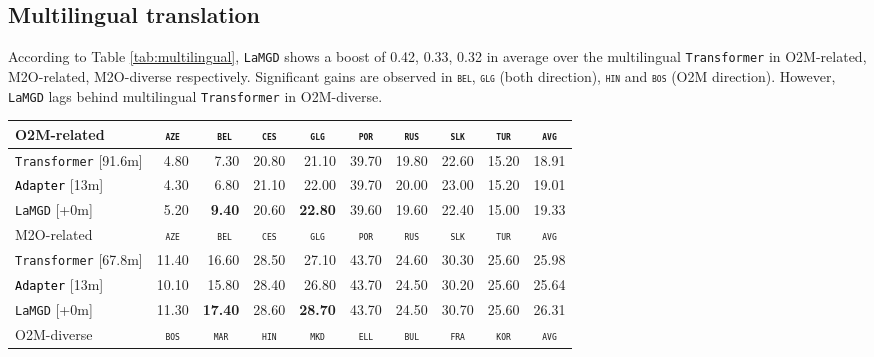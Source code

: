 \documentclass[11pt]{article}
\newcommand{\revision}[1]{\textcolor{black}{#1}}
\newcommand{\domain}[1]{\texttt{\textsc{#1}}}
\newcommand{\system}[1]{\texttt{{#1}}}
\newcommand{\SB}[1]{\textbf{#1}}
\begin{document}
\subsection{Multilingual translation}
According to Table \ref{tab:multilingual}, \system{LaMGD} shows a boost of 0.42, 0.33, 0.32 in average over the multilingual \system{Transformer} in O2M-related, M2O-related, M2O-diverse respectively. Significant gains are observed in \domain{bel}, \domain{glg} (both direction), \domain{hin} and \domain{bos} (O2M direction). However, \system{LaMGD} lags behind multilingual \system{Transformer} in O2M-diverse. 
\begin{table}[h!]
  \centering
  \begin{tabular}{|p{4cm}|*{9}{r|}} \hline
    O2M-related & \multicolumn{1}{c|}{\domain{aze}} & \multicolumn{1}{c|}{\domain{ bel}} & \multicolumn{1}{c|}{\domain{ces}} & \multicolumn{1}{c|}{\domain{glg}} & \multicolumn{1}{c|}{\domain{por}} & \multicolumn{1}{c|}{\domain{rus}} & \multicolumn{1}{c|}{\domain{slk}} & \multicolumn{1}{c|}{\domain{tur}} & \multicolumn{1}{c|}{\domain{avg}} \\ \hline 
    \system{Transformer}  \hfill{\footnotesize[91.6m]} & 4.80 &7.30&20.80&21.10&39.70&19.80&22.60&15.20&18.91 \\
    \revision{\system{Adapter}}   \hfill{\footnotesize[13m]} &4.30&6.80&21.10&22.00&39.70&20.00&23.00&15.20&19.01 \\ 
    \system{LaMGD}  \hfill{\footnotesize[+0m]}  & 5.20&\SB{9.40}&20.60&\SB{22.80}&39.60&19.60&22.40&15.00&19.33 \\ 
	\hline
    \hline
    M2O-related & \multicolumn{1}{c|}{\domain{aze}} & \multicolumn{1}{c|}{\domain{ bel}} & \multicolumn{1}{c|}{\domain{ces}} & \multicolumn{1}{c|}{\domain{glg}} & \multicolumn{1}{c|}{\domain{por}} & \multicolumn{1}{c|}{\domain{rus}} & \multicolumn{1}{c|}{\domain{slk}} & \multicolumn{1}{c|}{\domain{tur}} & \multicolumn{1}{c|}{\domain{avg}} \\ \hline 
    \system{Transformer}  \hfill{\footnotesize[67.8m]} &11.40&16.60&28.50&	27.10&43.70&24.60&30.30&25.60&25.98 \\
    \revision{\system{Adapter}}   \hfill{\footnotesize[13m]} &10.10&15.80&28.40&26.80&43.70&24.50&30.20&25.60&25.64\\ 
    \system{LaMGD}   \hfill{\footnotesize[+0m]}  &11.30&\SB{17.40}&28.60&\SB{28.70}&43.70&24.50&30.70&25.60&26.31 \\ 
    \hline
    \hline
    O2M-diverse & \multicolumn{1}{c|}{\domain{bos}} & \multicolumn{1}{c|}{\domain{mar}} & \multicolumn{1}{c|}{\domain{hin}} & \multicolumn{1}{c|}{\domain{mkd}} & \multicolumn{1}{c|}{\domain{ell}} & \multicolumn{1}{c|}{\domain{bul}} & \multicolumn{1}{c|}{\domain{fra}} & \multicolumn{1}{c|}{\domain{kor}} & \multicolumn{1}{c|}{\domain{avg}} \\ \hline 

\end{tabular}
\end{table}
\end{document}
